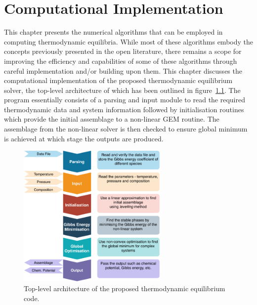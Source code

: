 \chapter{Computational Implementation} \label{chap:implementation}


	This chapter presents the numerical algorithms that can be employed in computing thermodynamic equilibria. While most of these algorithms embody the concepts previously presented in the open literature, there remains a scope for improving the efficiency and capabilities of some of these algorithms through careful implementation and/or building upon them. This chapter discusses the computational implementation of the proposed thermodynamic equilibrium solver, the top-level architecture of which has been outlined in figure~\ref{fig:structure}. The program essentially consists of a parsing and input module to read the required thermodynamic data and system information followed by initialisation routines which provide the initial assemblage to a non-linear GEM routine. The assemblage from the non-linear solver is then checked to ensure global minimum is achieved at which stage the outputs are produced.
	\begin{figure}[htbp]
	 	\centering
	   	\includegraphics[width=0.65\textwidth]{figures/YJ_structure.pdf}
	   	\caption{Top-level architecture of the proposed thermodynamic equilibrium code.}
	   	\label{fig:structure}
	\end{figure}

